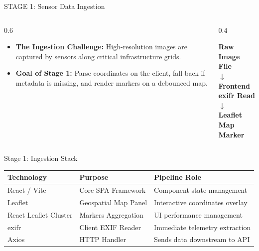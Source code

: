 \documentclass[aspectratio=169]{beamer}
\begin{document}
\begin{frame}{STAGE 1: Sensor Data Ingestion}
  \begin{columns}
    \begin{column}{0.6\textwidth}
      \begin{itemize}
        \item \textbf{The Ingestion Challenge:} High-resolution images are captured by sensors along critical infrastructure grids.
        \item \textbf{Goal of Stage 1:} Parse coordinates on the client, fall back if metadata is missing, and render markers on a debounced map.
      \end{itemize}
    \end{column}
    \begin{column}{0.4\textwidth}
      \begin{center}
        \textbf{Raw Image File} \\
        $\downarrow$ \\
        \textbf{Frontend exifr Read} \\
        $\downarrow$ \\
        \textbf{Leaflet Map Marker}
      \end{center}
    \end{column}
  \end{columns}
\end{frame}

\begin{frame}{Stage 1: Ingestion Stack}
  \begin{table}
    \centering
    \begin{tabular}{lll}
      \toprule
      \textbf{Technology} & \textbf{Purpose} & \textbf{Pipeline Role} \\
      \midrule
      React / Vite & Core SPA Framework & Component state management \\
      Leaflet & Geospatial Map Panel & Interactive coordinates overlay \\
      React Leaflet Cluster & Markers Aggregation & UI performance management \\
      exifr & Client EXIF Reader & Immediate telemetry extraction \\
      Axios & HTTP Handler & Sends data downstream to API \\
      \bottomrule
    \end{tabular}
  \end{table}
\end{frame}
\end{document}
